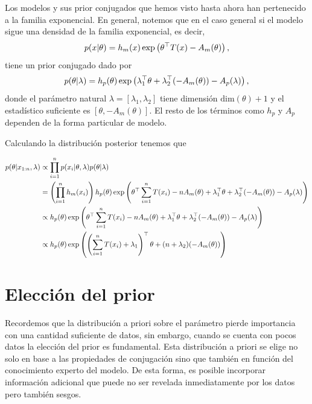 Los modelos y sus prior conjugados que hemos visto hasta ahora han pertenecido a la familia exponencial. En general, notemos que en el caso general si el modelo sigue una densidad de la familia exponencial, es decir,
\begin{equation}
	p(x|\theta) = h_m(x)\exp\left(\theta^\top T(x)-A_m(\theta)\right),
\end{equation}
tiene un prior conjugado dado por 
\begin{equation}
	p(\theta|\lambda) = h_p(\theta)\exp\left(\lambda_1^\top \theta + \lambda_2^\top(-A_m(\theta)) -A_p(\lambda)\right),
\end{equation}
donde el parámetro natural $\lambda = [\lambda_1, \lambda_2]$ tiene dimensión $\text{dim}(\theta) +1 $ y el estadístico suficiente es $[\theta, -A_m(\theta)]$. El resto de los términos como $h_p$ y $A_p$ dependen de la forma particular de modelo. 

Calculando la distribución posterior tenemos que 

\begin{align}
	p(\theta|x_{1:n},\lambda) 
	&\propto \prod_{i=1}^np(x_i|\theta,\lambda)p(\theta|\lambda)\\
	&=\left(\prod_{i=1}^n h_m(x_i)\right) h_p(\theta) \exp\left(\theta^\top \sum_{i=1}^nT(x_i)-nA_m(\theta)+\lambda_1^\top \theta + \lambda_2^\top(-A_m(\theta)) -A_p(\lambda)\right)\nonumber\\
	&\propto h_p(\theta) \exp\left(\theta^\top \sum_{i=1}^nT(x_i)-nA_m(\theta)+\lambda_1^\top \theta + \lambda_2^\top(-A_m(\theta)) -A_p(\lambda)\right)\nonumber\\
	&\propto h_p(\theta) \exp\left(\left(\sum_{i=1}^nT(x_i)+\lambda_1\right)^\top\theta + (n+\lambda_2)(-A_m(\theta))\right)\nonumber
\end{align}

\section{Elección del prior} %
\label{sec:elección_del_prior}
Recordemos que la distribución a priori sobre el parámetro pierde importancia con una cantidad suficiente de datos, sin embargo, cuando se cuenta con pocos datos la elección del prior es fundamental. Esta distribución a priori se elige no solo en base a las propiedades de conjugación sino que también en función del conocimiento experto del modelo. De esta forma, es posible incorporar información adicional que puede no ser revelada inmediatamente por los datos pero también sesgos. 

